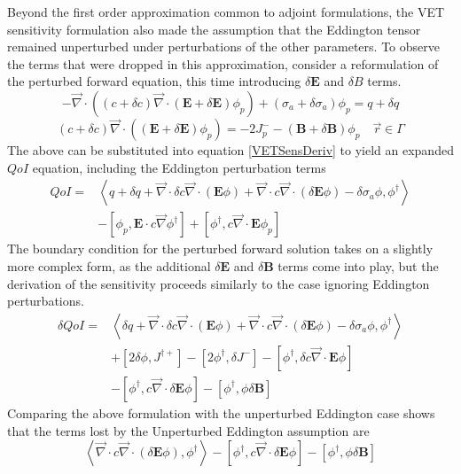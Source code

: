 \documentclass{article}
\newcommand{\vr}{\vec{r}}
\newcommand{\bra}{\left\langle}
\newcommand{\ket}{\right\rangle}
\newcommand{\sbra}{\left[}
\newcommand{\sket}{\right]}
\newcommand{\vdiv}{\vec{\nabla} \cdot}
\newcommand{\vgrad}{\vec{\nabla}}
\newcommand{\Edd}{\mathbf{E}}
\newcommand{\BEdd}{\mathbf{B}}
\newcommand{\siga}{\sigma_a}
\newcommand{\isigt}{c}
\newcommand{\scalSource}{q}
\newcommand{\qoi}{QoI}
\begin{document}
Beyond the first order approximation common to adjoint formulations, the VET sensitivity formulation also made the assumption that the Eddington tensor remained unperturbed under perturbations of the other parameters. To observe the terms that were dropped in this approximation, consider a reformulation of the perturbed forward equation, this time introducing $\delta \Edd$ and $\delta  B$ terms. 
\begin{equation}
\label{VEFPerEdd}
- \vdiv \left((\isigt + \delta \isigt)\vdiv (\Edd + \delta \Edd) \phi_p \right) + (\siga + \delta \siga)\phi_p = \scalSource + \delta \scalSource
\end{equation}
\begin{equation}
(\isigt + \delta \isigt) \vec{\nabla} \cdot \left((\Edd + \delta \Edd) \phi_p \right)  = - 2J_p^- - (\BEdd +\delta \BEdd) \phi_p \quad \vr \in \Gamma
\end{equation}
The above can be substituted into equation \ref{VETSensDeriv} to yield an expanded $\qoi$ equation, including the Eddington perturbation terms
\begin{equation}
\label{QoIVETAdjNoBCEdd}
\begin{split}
\qoi =& \bra \scalSource + \delta \scalSource + \vdiv \delta \isigt \vdiv \left( \Edd \phi \right) + \vdiv \isigt \vdiv \left( \delta \Edd \phi \right) - \delta \siga \phi, \phi^\dag \ket \\
&- \sbra \phi_p, \Edd \cdot \isigt \vgrad \phi^\dag \sket 
+ \sbra \phi^\dag , \isigt \vdiv \Edd \phi_p \sket
\end{split}
\end{equation}
The boundary condition for the perturbed forward solution takes on a slightly more complex form, as the additional $\delta \Edd$ and $\delta \BEdd$ terms come into play, but the derivation of the sensitivity proceeds similarly to the case ignoring Eddington perturbations.
\begin{equation}
\label{QoIVETAdjEdd}
\begin{split}
\delta \qoi =& \bra \delta \scalSource + \vdiv \delta \isigt \vdiv \left( \Edd \phi \right) + \vdiv \isigt \vdiv \left( \delta \Edd \phi \right) - \delta \siga \phi, \phi^\dag \ket \\
&+ \sbra 2\delta \phi, J^{\dag +} \sket  - \sbra 2\phi^\dag, \delta J^- \sket
- \sbra \phi^\dag, \delta \isigt \vdiv \Edd \phi \sket
\\
&- \sbra  \phi^\dag ,\isigt \vdiv \delta \Edd \phi \sket
- \sbra \phi^\dag, \phi \delta \BEdd \sket
\end{split}
\end{equation} 
Comparing the above formulation with the unperturbed Eddington case shows that the terms lost by the Unperturbed Eddington assumption are 
\begin{equation}
\label{EddErr}
 \bra \vdiv \isigt \vdiv \left( \delta \Edd \phi \right), \phi^\dag \ket
- \sbra  \phi^\dag ,\isigt \vdiv \delta \Edd \phi \sket
- \sbra \phi^\dag, \phi \delta \BEdd \sket
\end{equation} 
\end{document}
